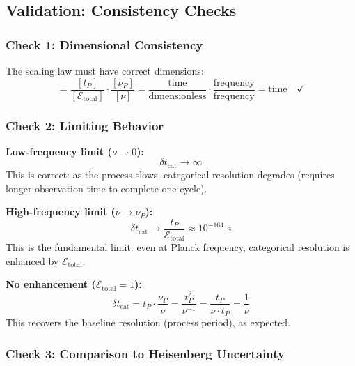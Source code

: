 \documentclass[twocolumn,10pt]{article}
\theoremstyle{remark}
\begin{document}
\subsection{Validation: Consistency Checks}

\subsubsection{Check 1: Dimensional Consistency}

The scaling law must have correct dimensions:
\begin{equation}
    [\delta t_{\text{cat}}] = \frac{[t_P]}{[\mathcal{E}_{\text{total}}]} \cdot \frac{[\nu_P]}{[\nu]} = \frac{\text{time}}{\text{dimensionless}} \cdot \frac{\text{frequency}}{\text{frequency}} = \text{time} \quad \checkmark
    \label{eq:dimensional_consistency}
\end{equation}

\subsubsection{Check 2: Limiting Behavior}

\textbf{Low-frequency limit ($\nu \to 0$):}
\begin{equation}
    \delta t_{\text{cat}} \to \infty
    \label{eq:low_freq_limit}
\end{equation}
This is correct: as the process slows, categorical resolution degrades (requires longer observation time to complete one cycle).

\textbf{High-frequency limit ($\nu \to \nu_P$):}
\begin{equation}
    \delta t_{\text{cat}} \to \frac{t_P}{\mathcal{E}_{\text{total}}} \approx 10^{-164} \text{ s}
    \label{eq:high_freq_limit}
\end{equation}
This is the fundamental limit: even at Planck frequency, categorical resolution is enhanced by $\mathcal{E}_{\text{total}}$.

\textbf{No enhancement ($\mathcal{E}_{\text{total}} = 1$):}
\begin{equation}
    \delta t_{\text{cat}} = t_P \cdot \frac{\nu_P}{\nu} = \frac{t_P^2}{\nu^{-1}} = \frac{t_P}{\nu \cdot t_P} = \frac{1}{\nu}
    \label{eq:no_enhancement_limit}
\end{equation}
This recovers the baseline resolution (process period), as expected.

\subsubsection{Check 3: Comparison to Heisenberg Uncertainty}
\end{document}
